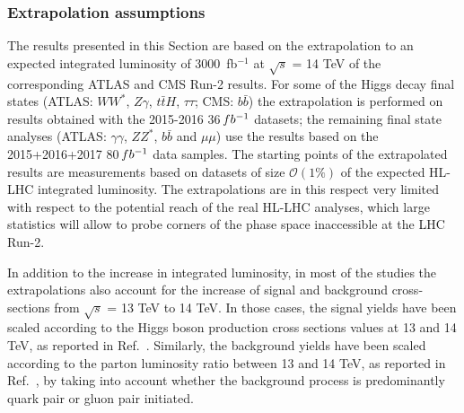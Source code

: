 \subsubsection{Extrapolation assumptions}
\label{sec:HiggsExtrapAss}


The results presented in this Section are based on the extrapolation to an expected integrated luminosity of 3000~fb$^{-1}$ at $\sqrt{s}$ = 14 TeV of the corresponding ATLAS and CMS Run-2 results. For some of the Higgs decay final states (ATLAS: $WW^*$, $Z\gamma$, $t\bar{t}H$, $\tau\tau$; CMS: $b\bar{b}$) the extrapolation is performed on results obtained with the 2015-2016 36\,$fb^{-1}$ datasets; the remaining final state analyses (ATLAS: $\gamma\gamma$, $ZZ^*$, $b\bar{b}$ and $\mu\mu$) use the results based on the 2015+2016+2017 80\,$fb^{-1}$ data samples. The starting points of the extrapolated results are measurements based on datasets of size $\mathcal{O}(1\%)$ of the expected HL-LHC integrated luminosity. The extrapolations are in this respect very limited with respect to the potential reach of the real HL-LHC analyses, which large statistics will allow to probe corners of the phase space inaccessible at the LHC Run-2.

In addition to the increase in integrated luminosity, in most of the studies the extrapolations also account for the increase of signal and background cross-sections from $\sqrt{s}$ = 13 TeV to 14 TeV.  In those cases, the signal yields have been scaled according to the Higgs boson production cross sections values at 13 and 14 TeV, as reported in Ref.~\cite{deFlorian:2016spz}. Similarly, the background yields have been scaled according to the parton luminosity ratio between 13 and 14 TeV, as reported in Ref.~\cite{Heinemeyer:2013tqa}, by taking into account whether the background process is predominantly quark pair or gluon pair initiated.

